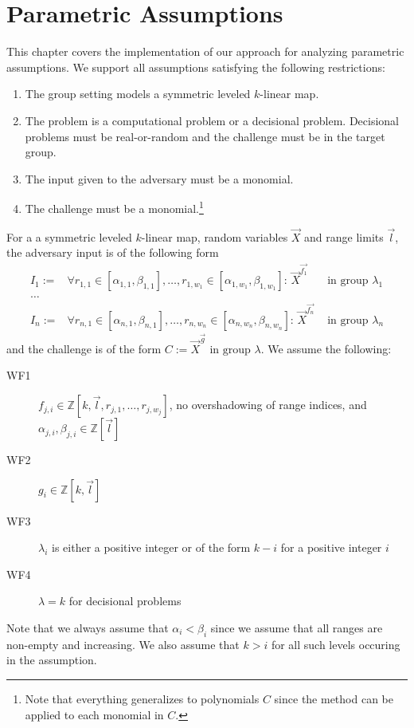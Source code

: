 \chapter{Parametric Assumptions}

This chapter covers the implementation of our approach for
analyzing parametric assumptions.
We support all assumptions satisfying the following restrictions:
\begin{enumerate}
\item The group setting models a symmetric leveled $k$-linear map.
\item The problem is a computational problem or a decisional
 problem. Decisional problems must be real-or-random and
 the challenge must be in the target group.
\item The input given to the adversary must be a monomial.
\item The challenge must be a monomial.\footnote{
    Note that everything generalizes to polynomials $C$ since
    the method can be applied to each monomial in $C$.}
\end{enumerate}%
%
\newcommand{\range}[1]{r_{#1} \in [\alpha_{#1},\beta_{#1}]}%
\renewcommand{\brack}[1]{[#1]}%
%
\label{assumption_def}%
For a a symmetric leveled $k$-linear map,
  random variables $\vec{X}$ and range limits $\vec{l}$,
  the adversary input is of the following form
\begin{align*}
  I_1 :={}& \forall \range{1,1},\ldots,\range{1,w_1}:\, \vec{X}^{\vec{f_{1}}}
    & \text{ in group }\lambda_1\\
  \ldots & \\
  I_n :={}& \forall \range{n,1},\ldots,\range{n,w_n}:\, \vec{X}^{\vec{f_{n}}}
    & \text{ in group }\lambda_n
\end{align*}
  and the challenge is of the form
  $C := \vec{X}^{\vec{g}} \text{ in group }\lambda$.
We assume the following:
\begin{description}
\item[WF1] $f_{j,i} \in \mathbb{Z}[k,\vec{l},r_{j,1},\ldots,r_{j,w_j}]$,
          no overshadowing of range indices, and
          $\alpha_{j,i},\beta_{j,i} \in \mathbb{Z}[\vec{l}]$
\item[WF2] $g_i \in \mathbb{Z}[k,\vec{l}]$
\item[WF3] $\lambda_i$ is either a positive integer or
  of the form $k - i$ for a positive integer $i$
\item[WF4] $\lambda=k$ for decisional problems
\end{description}
%
Note that we always assume that $\alpha_i < \beta_i$ since
  we assume that all ranges are non-empty and increasing.
We also assume that $k > i$ for all such levels occuring in the
  assumption.